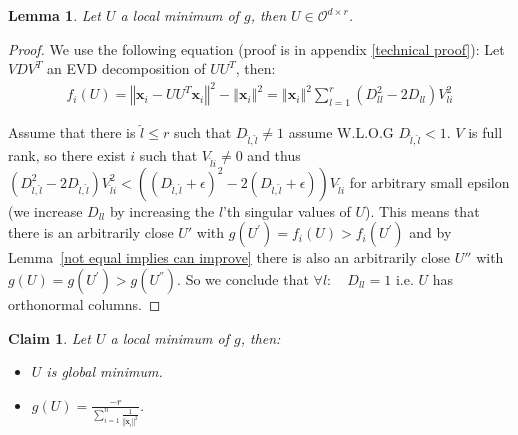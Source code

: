 \documentclass{article}
\newtheorem{lemma}[theorem]{Lemma}
\newtheorem{claim}{Claim}
\newcommand{\Lemmaref}[1]{Lemma~\ref{#1}}
\newcommand{\x}{{\mathbf x}}
\begin{document}
\begin{lemma} \label{local minimum orthogonal}
Let $U$ a local minimum of $g$, then $U\in\mathcal{O}^{d\times r}$.
\end{lemma}

\begin{proof}
We use the following equation (proof is in appendix \ref{technical proof}): Let $VDV^{T}$ an EVD decomposition of $UU^{T}$, then:
\begin{align*}\label{}
    f_i(U)=\left\Vert\x_{i}-UU^{T}\x_{i}\right\Vert^{2} - \left\Vert\x_{i}\right\Vert^{2}=\left\Vert\x_{i}\right\Vert^{2}\sum_{l=1}^{r}(D_{ll}^{2}-2D_{ll})V_{li}^{2}
\end{align*}

Assume that there is $\hat{l}\le r$ such that ${D}_{\hat{l},\hat{l}}\ne1$ assume W.L.O.G ${D}_{\hat{l},\hat{l}}<1$. $V$ is full rank, so there exist $i$ such that $V_{\hat{l}i}\ne0$  and thus $({D}_{\hat{l},\hat{l}}^2-2{D}_{\hat{l},\hat{l}})V_{\hat{l}i}^{2}<(({D}_{\hat{l},\hat{l}}+\epsilon)^2-2({D}_{\hat{l},\hat{l}}+\epsilon))V_{\hat{l}i}$ for arbitrary small epsilon (we increase $D_{ll}$ by increasing the $l$'th singular values of $U$). This means that there is an arbitrarily close $U{'}$ with $g(U^{'})=f_i(U)>f_i(U^{'})$ and by \Lemmaref{not equal implies can improve} there is also an arbitrarily close $U{''}$ with $g({U})=g(U^{'})>g(U^{''})$. So we conclude that $\forall l: \quad D_{ll}=1$ i.e. $U$ has orthonormal columns. 
\end{proof}

\begin{claim} \label{local minimum is global}
Let $U$ a local minimum of $g$, then: 
\begin{itemize}
    \item $U$ is global minimum.
    \item $g(U)=\frac{-r}{\sum_{i=1}^n \frac{1}{\left\Vert \x_{i}\right\Vert^{2}}}$.
\end{itemize}
\end{claim}
\end{document}

